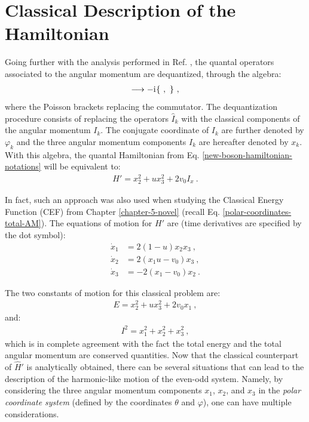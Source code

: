 \section{Classical Description of the Hamiltonian}
\label{classical-description-new-boson-section}

Going further with the analysis performed in Ref. \cite{raduta2020new}, the quantal operators associated to the angular momentum are dequantized, through the algebra:
\begin{align}
    [\ ,\ ] \longrightarrow -\iu\{\ ,\ \}\ ,
\end{align}
where the Poisson brackets replacing the commutator. The dequantization procedure consists of replacing the operators $\hat{I}_k$ with the classical components of the angular momentum $I_k$. The conjugate coordinate of $I_k$ are further denoted by $\varphi_k$ and the three angular momentum components $I_k$ are hereafter denoted by $x_k$. With this algebra, the quantal Hamiltonian from Eq. \ref{new-boson-hamiltonian-notations} will be equivalent to:
\begin{align}
    H'=x_2^2+ux_3^2+2v_0I_x\ .
    \label{new-boson-h-prime-classical}
\end{align}

In fact, such an approach was also used when studying the Classical Energy Function (CEF) from Chapter \ref{chapter-5-novel} (recall Eq. \ref{polar-coordinates-total-AM}). The equations of motion for $H'$ are (time derivatives are specified by the dot symbol):
\begin{align}
    \dot{x}_1&=2(1-u)x_2x_3\ ,\nonumber\\
    \dot{x}_2&=2(x_1u-v_0)x_3\ ,\nonumber\\
    \dot{x}_3&=-2(x_1-v_0)x_2\ .
\end{align}

The two constants of motion for this classical problem are:
\begin{align}
    E=x_2^2+ux_3^2+2v_0x_1\ ,
\end{align}
and:
\begin{align}
    I^2=x_1^2+x_2^2+x_3^2\ ,
\end{align}
which is in complete agreement with the fact the total energy and the total angular momentum are conserved quantities. Now that the classical counterpart of $\hat{H}'$ is analytically obtained, there can be several situations that can lead to the description of the harmonic-like motion of the even-odd system. Namely, by considering the three angular momentum components $x_1$, $x_2$, and $x_3$ in the \emph{polar coordinate system} (defined by the coordinates $\theta$ and $\varphi$), one can have multiple considerations.

